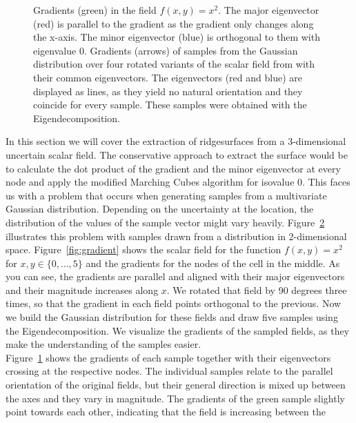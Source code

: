 \begin{figure}
\begin{subfigure}[b]{0.49\textwidth}
        \caption{}
        \label{fig:samples}
    \end{subfigure}
    \caption{ Gradients (green) in the field
    $f(x,y)=x^2$. The major eigenvector (red) is parallel to the
    gradient as the gradient only changes along the x-axis. The minor
    eigenvector (blue) is orthogonal to them with eigenvalue 0.
     Gradients (arrows) of samples from the Gaussian
    distribution over four rotated variants of the scalar field from
     with their common eigenvectors. The
    eigenvectors (red and blue) are displayed as lines, as they yield no
    natural orientation and they coincide for every sample. These
    samples were obtained with the Eigendecomposition.}
    \label{fig:sampComp}
\end{figure}
\indent In this section we will cover the extraction of ridgesurfaces
from a 3-dimensional uncertain scalar field. The conservative approach
to extract the surface would be to calculate the dot product of the
gradient and the minor eigenvector at every node and apply the modified
Marching Cubes algorithm for isovalue 0. This faces us with a problem
that occurs when generating samples from a multivariate Gaussian
distribution. Depending on the uncertainty at the location, the
distribution of the values of the sample vector might vary heavily.
Figure~\ref{fig:sampComp} illustrates this problem with samples drawn
from a distribution in 2-dimensional space. Figure~\ref{fig:gradient}
shows the scalar field for the function $f(x,y) = x^2$ for $x, y \in
\{0,\dots,5\}$ and the gradients for the nodes of the cell in the
middle. As you can see, the gradients are parallel and aligned with
their major eigenvectors and their magnitude increases along $x$. We
rotated that field by 90 degrees three times, so that the gradient in
each field points orthogonal to the previous. Now we build the Gaussian
distribution for these fields and draw five samples using the
Eigendecomposition. We visualize the gradients of the sampled fields, as
they make the understanding of the samples easier.\\
\indent Figure~\ref{fig:samples} shows the gradients of each sample
together with their eigenvectors crossing at the respective nodes. The
individual samples relate to the parallel orientation of the original
fields, but their general direction is mixed up between the axes and
they vary in magnitude. The gradients of the green sample slightly point
towards each other, indicating that the field is increasing between the
